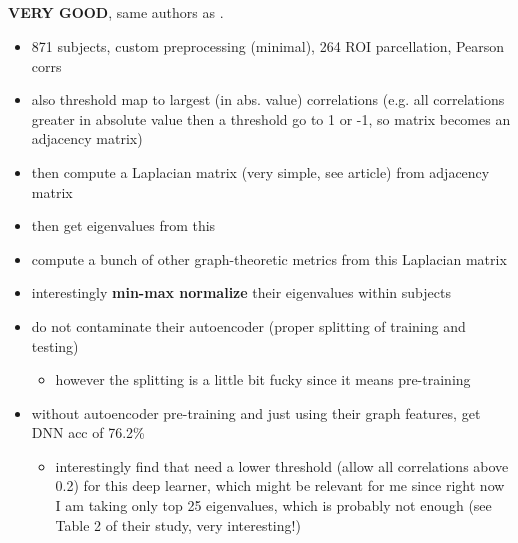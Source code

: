 \documentclass[10pt]{article}
\begin{document}
\subsection{\citet{yinDiagnosisAutismSpectrum2021}}

\textbf{VERY GOOD}, same authors as \citet{mostafaDiagnosisAutismSpectrum2019}.

\begin{itemize}
  \item 871 subjects, custom preprocessing (minimal), 264 ROI parcellation, Pearson corrs
  \item also threshold map to largest (in abs. value) correlations (e.g. all correlations greater in
  absolute value then a threshold go to 1 or -1, so matrix becomes an adjacency matrix)
  \item then compute a Laplacian matrix (very simple, see article) from adjacency matrix
  \item then get eigenvalues from this
  \item compute a bunch of other graph-theoretic metrics from this Laplacian matrix
  \item interestingly \textbf{min-max normalize} their eigenvalues within subjects
  \item do not contaminate their autoencoder (proper splitting of training and testing)
  \begin{itemize}
    \item however the splitting is a little bit fucky since it means pre-training
  \end{itemize}
  \item without autoencoder pre-training and just using their graph features, get DNN acc of 76.2\%
  \begin{itemize}
    \item interestingly find that need a lower threshold (allow all correlations above 0.2) for this
    deep learner, which might be relevant for me since right now I am taking only top 25
    eigenvalues, which is probably not enough (see Table 2 of their study, very interesting!)
  \end{itemize}
\end{itemize}
\end{document}
